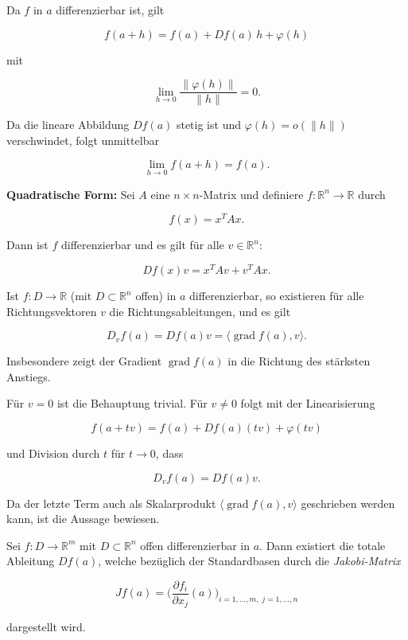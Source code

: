 \begin{beweisbox}
Da $ f $ in $ a $ differenzierbar ist, gilt


$$
f(a+h)= f(a) + Df(a)\,h + \varphi(h)
$$


mit


$$
\lim_{h\to 0}\frac{\|\varphi(h)\|}{\|h\|}=0.
$$


Da die lineare Abbildung $ Df(a) $ stetig ist und $\varphi(h)=o(\|h\|)$ verschwindet, folgt unmittelbar


$$
\lim_{h\to 0} f(a+h) = f(a).
$$


\end{beweisbox}

\begin{beispielbox}
\textbf{Quadratische Form:}  
Sei $ A $ eine $ n\times n $-Matrix und definiere $ f: \mathbb{R}^n \to \mathbb{R} $ durch


$$
f(x) = x^T A x.
$$


Dann ist $ f $ differenzierbar und es gilt für alle $ v\in \mathbb{R}^n $:


$$
Df(x)v = x^T A v + v^T A x.
$$


\end{beispielbox}

\begin{satz}{}
Ist $ f: D \to \mathbb{R} $ (mit $ D \subset \mathbb{R}^n $ offen) in $ a $ differenzierbar, so existieren für alle Richtungsvektoren $ v $ die Richtungsableitungen, und es gilt


$$
D_v f(a)= Df(a)v= \langle \operatorname{grad} f(a), v \rangle.
$$


Insbesondere zeigt der Gradient $ \operatorname{grad} f(a) $ in die Richtung des stärksten Anstiegs.
\end{satz}

\begin{beweisbox}
Für $ v=0 $ ist die Behauptung trivial. Für $ v\neq 0 $ folgt mit der Linearisierung


$$
f(a+tv)= f(a)+ Df(a)(tv) + \varphi(tv)
$$


und Division durch $ t $ für $ t\to 0 $, dass


$$
D_v f(a)= Df(a)v.
$$


Da der letzte Term auch als Skalarprodukt $ \langle \operatorname{grad} f(a), v \rangle $ geschrieben werden kann, ist die Aussage bewiesen.
\end{beweisbox}

\begin{satz}{}
Sei $ f: D \to \mathbb{R}^m $ mit $ D \subset \mathbb{R}^n $ offen differenzierbar in $ a $. Dann existiert die totale Ableitung $ Df(a) $, welche bezüglich der Standardbasen durch die \emph{Jakobi-Matrix}


$$
Jf(a)= \Biggl( \frac{\partial f_i}{\partial x_j}(a) \Biggr)_{i=1,\dots,m,\; j=1,\dots,n}
$$


dargestellt wird.
\end{satz}

